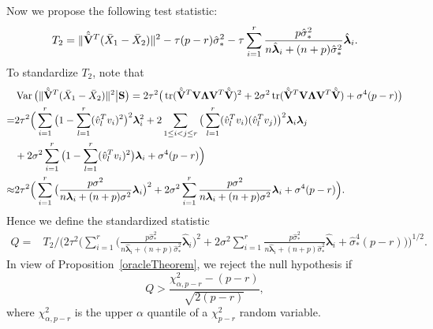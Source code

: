 \documentclass[review]{elsarticle}
\DeclareMathOperator{\mytr}{tr}
\DeclareMathOperator{\myVar}{Var}
\newcommand{\bfsym}[1]{\ensuremath{\boldsymbol{#1}}}
\def\blambda {\bfsym {\lambda}}        \def\bLambda {\bfsym {\Lambda}}
\theoremstyle{plain}
\theoremstyle{definition}
\theoremstyle{remark}
\begin{document}

Now we propose the following test statistic:
$$
T_2=
\|\hat{\tilde{\BV}}^T (\bar{X}_1-\bar{X}_2)\|^2
-
\tau(p-r)\hat{\sigma}_*^2 
- \tau\sum_{i=1}^r \frac{p\hat{\sigma}_*^2}{n\hat{\blambda}_i+(n+p)\hat{\sigma}_*^2}\hat{\blambda}_i.
$$
To standardize $T_2$, note that
$$
\begin{aligned}
    &\myVar\big(
\|\hat{\tilde{\BV}}^T (\bar{X}_1-\bar{X}_2)\|^2
\big| \BS
\big)
    =2\tau^2\big(
\mytr(\hat{\tilde{\BV}}^T \BV \bLambda \BV^T\hat{\tilde{\BV}})^2
+
2\sigma^2\mytr(\hat{\tilde{\BV}}^T \BV \bLambda \BV^T\hat{\tilde{\BV}})
+\sigma^4 (p-r)
\big)
\\
    =&
    2\tau^2\Big(
    \sum_{i=1}^r \big(1-\sum_{l=1}^r (\hat{v}_l^T v_i)^2\big)^2 \blambda_i^2
    +2\sum_{1\leq i<j \leq r}\big(\sum_{l=1}^r (\hat{v}_l^T v_i)(\hat{v}_l^T v_j )\big)^2\blambda_i\blambda_j
    \\
    &+
    2\sigma^2\sum_{i=1}^r \big(1-\sum_{l=1}^r (\hat{v}_l^T v_i)^2\big) \blambda_i
    +\sigma^4 (p-r)
    \Big)
    \\
    \approx&
    2\tau^2\Big(
    \sum_{i=1}^r \big(\frac{p\sigma^2}{n\blambda_i+(n+p)\sigma^2}\blambda_i\big)^2
    +
    2\sigma^2\sum_{i=1}^r \frac{p\sigma^2}{n\blambda_i+(n+p)\sigma^2}\blambda_i
    +\sigma^4 (p-r)
    \Big).
\end{aligned}
$$
Hence we define the standardized statistic
$$
    \begin{aligned}
        Q=&T_2/
   \Bigg( 
        2\tau^2\Big(
        \sum_{i=1}^r \big(\frac{p\hat{\sigma}_*^2}{n\hat{\blambda}_i+(n+p)\hat{\sigma}_*^2}\hat{\blambda}_i\big)^2
    +
        2\sigma^2\sum_{i=1}^r \frac{p\hat{\sigma}_*^2}{n\hat{\blambda}_i+(n+p)\hat{\sigma}_*^2}\hat{\blambda}_i
        +\hat{\sigma}_*^4 (p-r)
    \Big)\Bigg)^{1/2}.
    \end{aligned}
$$
In view of Proposition~\ref{oracleTheorem}, we reject the null hypothesis if
$$
        Q>\frac{\chi^2_{\alpha, p-r}-(p-r)}{\sqrt{2(p-r)}},
$$
where $\chi^2_{\alpha, p-r}$ is the upper $\alpha$ quantile of a $\chi^2_{p-r}$ random variable.
\end{document}
